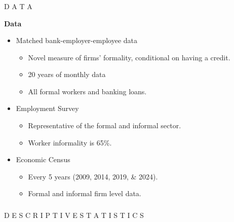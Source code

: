 \documentclass[aspectratio=169]{beamer} %
\begin{document}

\begin{frame}[noframenumbering]
\frametitle{}

\begin{center}
    \LARGE D A T A
\end{center}

\end{frame}


\begin{frame}{\textbf{Data}}

\begin{itemize}
    \item Matched bank-employer-employee data
    \begin{itemize}
        \item Novel measure of firms' formality, conditional on having a credit.
        \item 20 years of monthly data
        \item All formal workers and banking loans.
    \end{itemize}
    \vspace{5mm}
    \item Employment Survey
    \begin{itemize}
        \item Representative of the formal and informal sector. 
        \item Worker informality is 65\%.
    \end{itemize}
    \vspace{5mm}
    \item Economic Census
    \begin{itemize}
        \item Every 5 years (2009, 2014, 2019, \& 2024).
        \item Formal and informal firm level data.
    \end{itemize}
\end{itemize}



\end{frame}


\begin{frame}[noframenumbering]
\frametitle{}

\begin{center}
    \LARGE D E S C R I P T I V E \quad S T A T I S T I C S 
\end{center}

\end{frame}
\end{document}
